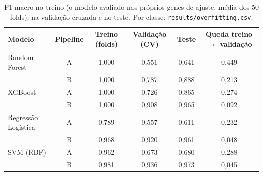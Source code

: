 \begin{table}[htbp]
  \centering
  \caption{F1-macro no treino (o modelo avaliado nos próprios genes de ajuste, média dos 50 folds), na validação cruzada e no teste. Por classe: \texttt{results/overfitting.csv}.}
  \label{tab:overfitting}
  \begin{tabular}{lccccc}
    \toprule
    Modelo & Pipeline & Treino (folds) & Validação (CV) & Teste & Queda treino $\to$ validação \\
    \midrule
    Random Forest & A & 1,000 & 0,551 & 0,641 & 0,449 \\
     & B & 1,000 & 0,787 & 0,888 & 0,213 \\
    XGBoost & A & 1,000 & 0,726 & 0,865 & 0,274 \\
     & B & 1,000 & 0,908 & 0,965 & 0,092 \\
    Regressão Logística & A & 0,789 & 0,557 & 0,611 & 0,232 \\
     & B & 0,968 & 0,920 & 0,961 & 0,048 \\
    SVM (RBF) & A & 0,962 & 0,673 & 0,680 & 0,288 \\
     & B & 0,981 & 0,936 & 0,973 & 0,045 \\
    \bottomrule
  \end{tabular}
\end{table}
